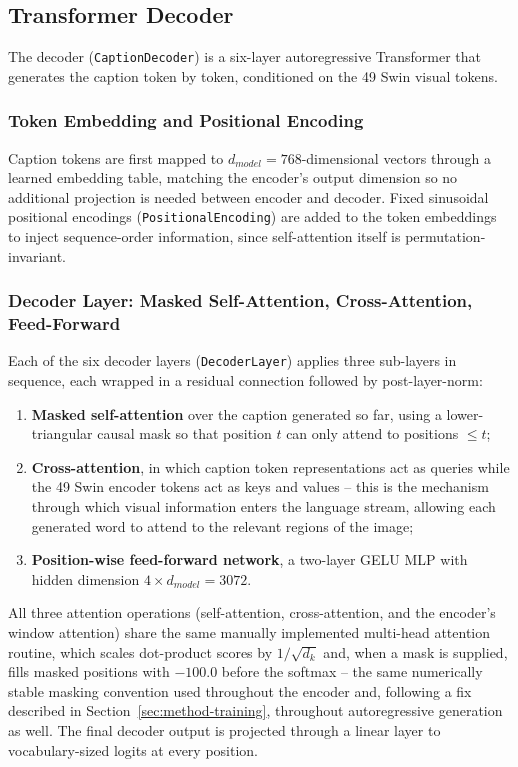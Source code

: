 \documentclass[conference]{IEEEtran}
\begin{document}
\subsection{Transformer Decoder}
\label{sec:method-decoder}

The decoder (\texttt{CaptionDecoder}) is a six-layer autoregressive Transformer that generates the caption token by token, conditioned on the 49 Swin visual tokens.

\subsubsection{Token Embedding and Positional Encoding}
Caption tokens are first mapped to $d_{model}=768$-dimensional vectors through a learned embedding table, matching the encoder's output dimension so no additional projection is needed between encoder and decoder. Fixed sinusoidal positional encodings (\texttt{PositionalEncoding}) are added to the token embeddings to inject sequence-order information, since self-attention itself is permutation-invariant.

\subsubsection{Decoder Layer: Masked Self-Attention, Cross-Attention, Feed-Forward}
Each of the six decoder layers (\texttt{DecoderLayer}) applies three sub-layers in sequence, each wrapped in a residual connection followed by post-layer-norm:
\begin{enumerate}
    \item \textbf{Masked self-attention} over the caption generated so far, using a lower-triangular causal mask so that position $t$ can only attend to positions $\le t$;
    \item \textbf{Cross-attention}, in which caption token representations act as queries while the 49 Swin encoder tokens act as keys and values -- this is the mechanism through which visual information enters the language stream, allowing each generated word to attend to the relevant regions of the image;
    \item \textbf{Position-wise feed-forward network}, a two-layer GELU MLP with hidden dimension $4\times d_{model}=3072$.
\end{enumerate}
All three attention operations (self-attention, cross-attention, and the encoder's window attention) share the same manually implemented multi-head attention routine, which scales dot-product scores by $1/\sqrt{d_k}$ and, when a mask is supplied, fills masked positions with $-100.0$ before the softmax -- the same numerically stable masking convention used throughout the encoder and, following a fix described in Section~\ref{sec:method-training}, throughout autoregressive generation as well. The final decoder output is projected through a linear layer to vocabulary-sized logits at every position.
\end{document}
